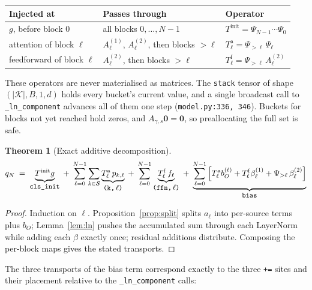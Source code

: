 \documentclass[11pt]{article}
\theoremstyle{plain}
\newtheorem{theorem}{Theorem}
\theoremstyle{remark}
\newcommand{\Sset}{\mathcal{S}}
\newcommand{\Kset}{\mathcal{K}}
\newcommand{\code}[1]{\texttt{\small #1}}
\begin{document}
\begin{center}
\begin{tabular}{@{}l l l@{}}
\toprule
\textbf{Injected at} & \textbf{Passes through} & \textbf{Operator} \\
\midrule
$g$, before block $0$ & all blocks $0,\dots,N-1$
  & $T^{\text{init}} = \Psi_{N-1}\cdots\Psi_0$ \\
attention of block $\ell$ & $A^{(1)}_\ell$, $A^{(2)}_\ell$, then blocks $>\ell$
  & $T^{\mathrm a}_\ell = \Psi_{>\ell}\,\Psi_\ell$ \\
feedforward of block $\ell$ & $A^{(2)}_\ell$, then blocks $>\ell$
  & $T^{\mathrm f}_\ell = \Psi_{>\ell}\,A^{(2)}_\ell$ \\
\bottomrule
\end{tabular}
\end{center}

\medskip
\noindent
These operators are never materialised as matrices. The \code{stack} tensor of
shape $(\lvert\Kset\rvert, B, 1, d)$ holds every bucket's current value, and a
single broadcast call to \code{\_ln\_component} advances all of them one step
(\code{model.py:336, 346}). Buckets for blocks not yet reached hold zeros, and
$A_{\gamma,s}\mathbf{0} = \mathbf{0}$, so preallocating the full set is safe.

\begin{theorem}[Exact additive decomposition]
\label{thm:main}
\[
  q_N \;=\;
  \underbrace{T^{\text{init}} g}_{\code{cls\_init}}
  \;+\; \sum_{\ell=0}^{N-1}\sum_{k\in\Sset}
        \underbrace{T^{\mathrm a}_\ell\, p_{k,\ell}}_{\code{(k,$\,\ell$)}}
  \;+\; \sum_{\ell=0}^{N-1}
        \underbrace{T^{\mathrm f}_\ell\, f_\ell}_{\code{(ffn,$\,\ell$)}}
  \;+\; \underbrace{\sum_{\ell=0}^{N-1}
        \Big[T^{\mathrm a}_\ell b_O^{(\ell)}
           + T^{\mathrm f}_\ell \beta^{(1)}_\ell
           + \Psi_{>\ell}\,\beta^{(2)}_\ell\Big]}_{\code{bias}}
\]
\end{theorem}

\begin{proof}
Induction on $\ell$. Proposition~\ref{prop:split} splits $a_\ell$ into
per-source terms plus $b_O$; Lemma~\ref{lem:ln} pushes the accumulated sum
through each LayerNorm while adding each $\beta$ exactly once; residual
additions distribute. Composing the per-block maps gives the stated
transports.
\end{proof}

\noindent
The three transports of the bias term correspond exactly to the three
\code{+=} sites and their placement relative to the \code{\_ln\_component}
calls:
\end{document}
